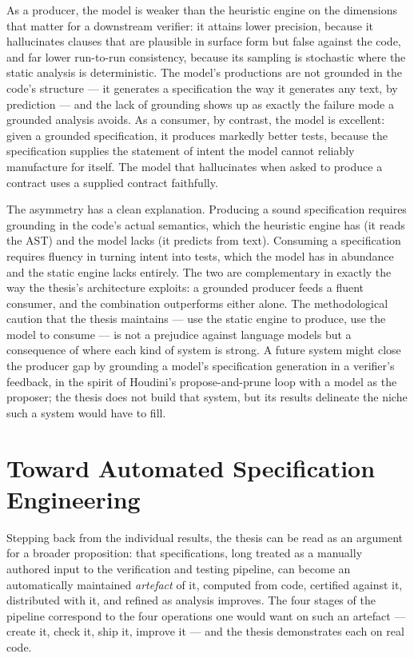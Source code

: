 As a producer, the model is weaker than the heuristic engine on the dimensions
that matter for a downstream verifier: it attains lower precision, because it
hallucinates clauses that are plausible in surface form but false against the
code, and far lower run-to-run consistency, because its sampling is stochastic
where the static analysis is deterministic. The model's productions are not
grounded in the code's structure --- it generates a specification the way it
generates any text, by prediction --- and the lack of grounding shows up as
exactly the failure mode a grounded analysis avoids. As a consumer, by contrast,
the model is excellent: given a grounded specification, it produces markedly
better tests, because the specification supplies the statement of intent the
model cannot reliably manufacture for itself. The model that hallucinates when
asked to produce a contract uses a supplied contract faithfully.

The asymmetry has a clean explanation. Producing a sound specification requires
grounding in the code's actual semantics, which the heuristic engine has (it
reads the AST) and the model lacks (it predicts from text). Consuming a
specification requires fluency in turning intent into tests, which the model has
in abundance and the static engine lacks entirely. The two are complementary in
exactly the way the thesis's architecture exploits: a grounded producer feeds a
fluent consumer, and the combination outperforms either alone. The methodological
caution that the thesis maintains --- use the static engine to produce, use the
model to consume --- is not a prejudice against language models but a
consequence of where each kind of system is strong. A future system might close
the producer gap by grounding a model's specification generation in a verifier's
feedback, in the spirit of Houdini's propose-and-prune loop with a model as the
proposer; the thesis does not build that system, but its results delineate the
niche such a system would have to fill.

\section{Toward Automated Specification Engineering}
\label{sec:syn-vision}

Stepping back from the individual results, the thesis can be read as an argument
for a broader proposition: that specifications, long treated as a manually
authored input to the verification and testing pipeline, can become an
automatically maintained \emph{artefact} of it, computed from code, certified
against it, distributed with it, and refined as analysis improves. The four
stages of the pipeline correspond to the four operations one would want on such
an artefact --- create it, check it, ship it, improve it --- and the thesis
demonstrates each on real code.

